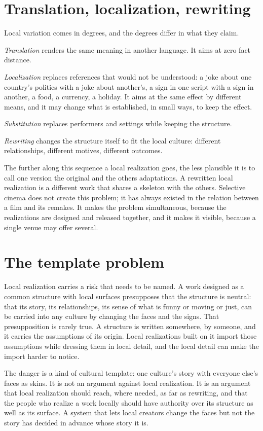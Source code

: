 \section{Translation, localization, rewriting}

Local variation comes in degrees, and the degrees differ in what they claim.

\emph{Translation} renders the same meaning in another language. It aims at zero fact distance.

\emph{Localization} replaces references that would not be understood: a joke about one country's politics with a joke about another's, a sign in one script with a sign in another, a food, a currency, a holiday. It aims at the same effect by different means, and it may change what is established, in small ways, to keep the effect.

\emph{Substitution} replaces performers and settings while keeping the structure.

\emph{Rewriting} changes the structure itself to fit the local culture: different relationships, different motives, different outcomes.

The further along this sequence a local realization goes, the less plausible it is to call one version the original and the others adaptations. A rewritten local realization is a different work that shares a skeleton with the others. Selective cinema does not create this problem; it has always existed in the relation between a film and its remakes. It makes the problem simultaneous, because the realizations are designed and released together, and it makes it visible, because a single venue may offer several.

\section{The template problem}

Local realization carries a risk that needs to be named. A work designed as a common structure with local surfaces presupposes that the structure is neutral: that its story, its relationships, its sense of what is funny or moving or just, can be carried into any culture by changing the faces and the signs. That presupposition is rarely true. A structure is written somewhere, by someone, and it carries the assumptions of its origin. Local realizations built on it import those assumptions while dressing them in local detail, and the local detail can make the import harder to notice.

The danger is a kind of cultural template: one culture's story with everyone else's faces as skins. It is not an argument against local realization. It is an argument that local realization should reach, where needed, as far as rewriting, and that the people who realize a work locally should have authority over its structure as well as its surface. A system that lets local creators change the faces but not the story has decided in advance whose story it is.

